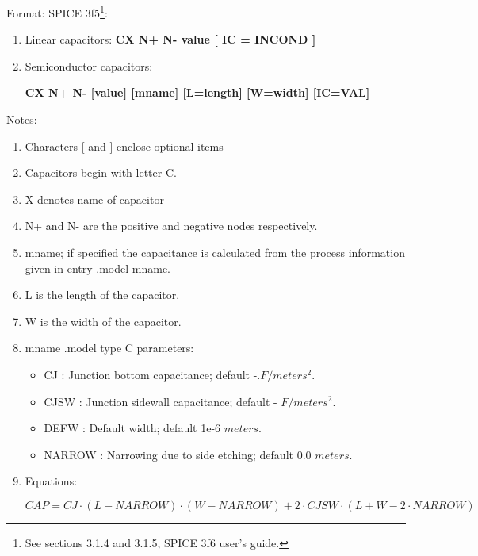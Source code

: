 \begin{flushleft}
Format: SPICE 3f5\footnote{See sections 3.1.4 and 3.1.5, SPICE 3f6 user's guide.}:
\begin{enumerate}
\item Linear capacitors: \textbf{CX N+ N- value [ IC = INCOND ]}
\item Semiconductor capacitors: 

\textbf{CX N+ N- [value] [mname] [L=length] [W=width] [IC=VAL]}                                                                                                                                                                                                                            \end{enumerate}
 \end{flushleft}

\begin{flushleft}
Notes: 
  \begin{enumerate}
   \item Characters [ and ] enclose optional items 
 \item Capacitors begin with letter C.
 \item X denotes name of capacitor
 \item N+ and N- are the positive and negative nodes respectively.
 \item mname; if specified the capacitance is calculated from the process information given in entry .model mname.
 \item L is the length of the capacitor.
 \item W is the width of the capacitor.
 \item mname .model type C parameters:
 \begin{itemize}
\item CJ     : Junction bottom capacitance; default -.$F / meters^{2}$.
\item CJSW   : Junction sidewall capacitance; default - $F / meters^{2}$.
\item DEFW   : Default width; default 1e-6 $meters$.
\item NARROW : Narrowing due to side etching; default 0.0 $meters$.
\end{itemize}

 
  \item Equations:
   \linebreak
   \begin{footnotesize}$CAP = CJ \cdot \left( L - NARROW \right) \cdot \left( W - NARROW\right) + 2 \cdot CJSW \cdot \left( L + W - 2 \cdot NARROW\right) $
\end{footnotesize}
  \end{enumerate}

\end{flushleft}


